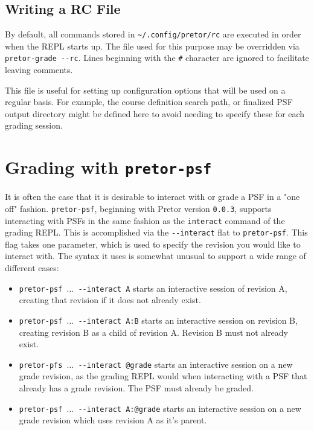 \documentclass{book}
\begin{document}
\subsection{Writing a RC File} \label{sec:rcfile}

By default, all commands stored in \texttt{\textasciitilde/.config/pretor/rc} are executed in
order when the REPL starts up. The file used for this purpose may be overridden
via \texttt{pretor-grade -{}-rc}. Lines beginning with the \texttt{\#}
character are ignored to facilitate leaving comments.

This file is useful for setting up configuration options that will be used on a
regular basis. For example, the course definition search path, or finalized PSF
output directory might be defined here to avoid needing to specify these for
each grading session.

\section{Grading with \texttt{pretor-psf}}

It is often the case that it is desirable to interact with or grade a PSF in a
"one off" fashion. \texttt{pretor-psf}, beginning with Pretor version
\texttt{0.0.3}, supports interacting with PSFs in the same fashion as the
\texttt{interact} command of the grading REPL. This is accomplished via the
\texttt{-{}-interact} flat to \texttt{pretor-psf}. This flag takes one
parameter, which is used to specify the revision you would like to interact
with. The syntax it uses is somewhat unusual to support a wide range of
different cases:

\begin{itemize}

	\item \texttt{pretor-psf $\hdots$ -{}-interact A} starts an interactive
		session of revision A, creating that revision if it does not
		already exist.

	\item \texttt{pretor-psf $\hdots$ -{}-interact A:B} starts an
		interactive session on revision B, creating revision B as a
		child of revision A. Revision B must not already exist.

	\item \texttt{pretor-pfs $\hdots$ -{}-interact @grade} starts an
		interactive session on a new grade revision, as the grading
		REPL would when interacting with a PSF that already has a grade
		revision. The PSF must already be graded.

	\item \texttt{pretor-psf $\hdots$ -{}-interact A:@grade} starts an
		interactive session on a new grade revision which uses revision
		A as it's parent.

\end{itemize}
\end{document}
